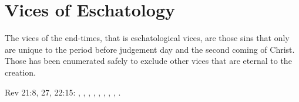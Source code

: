 \section{Vices of Eschatology}

The vices of the end-times, that is eschatological vices, are those sins that only are unique to the period before judgement day and the second coming of Christ. Those has been enumerated safely to exclude other vices that are eternal to the creation.

Rev 21:8, 27, 22:15:
,
,
,
,
,
,
,
,
.
